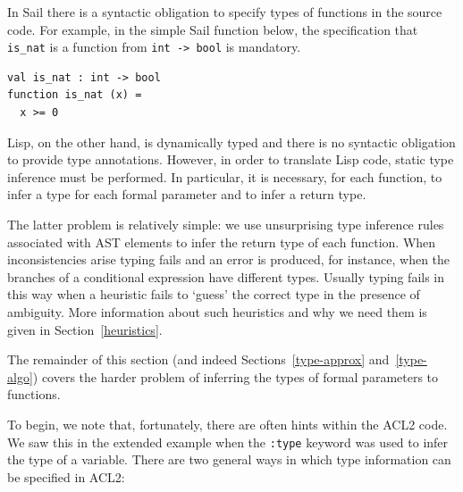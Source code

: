 \documentclass[a4paper,12pt,twoside,openright]{report}
\begin{document}
In Sail there is a syntactic obligation to specify types of functions in the source code.  For example, in the simple Sail function below, the specification that \texttt{is\_nat} is a function from \texttt{int -> bool} is mandatory.

\begin{minipage}{\linewidth}
\begin{lstlisting}[language=sail]
val is_nat : int -> bool
function is_nat (x) =
  x >= 0
\end{lstlisting}
\end{minipage}

Lisp, on the other hand, is dynamically typed and there is no syntactic obligation to provide type annotations.  However, in order to translate Lisp code, static type inference must be performed.  In particular, it is necessary, for each function, to infer a type for each formal parameter and to infer a return type.

The latter problem is relatively simple: we use unsurprising type inference rules associated with AST elements to infer the return type of each function.  When inconsistencies arise typing fails and an error is produced, for instance, when the branches of a conditional expression have different types.  Usually typing fails in this way when a heuristic fails to `guess' the correct type in the presence of ambiguity.  More information about such heuristics and why we need them is given in Section~\ref{heuristics}.

The remainder of this section (and indeed Sections~\ref{type-approx} and~\ref{type-algo}) covers the harder problem of inferring the types of formal parameters to functions.

To begin, we note that, fortunately, there are often hints within the ACL2 code.  We saw this in the extended example when the \texttt{:type} keyword was used to infer the type of a variable. There are two general ways in which type information can be specified in ACL2:
\end{document}
